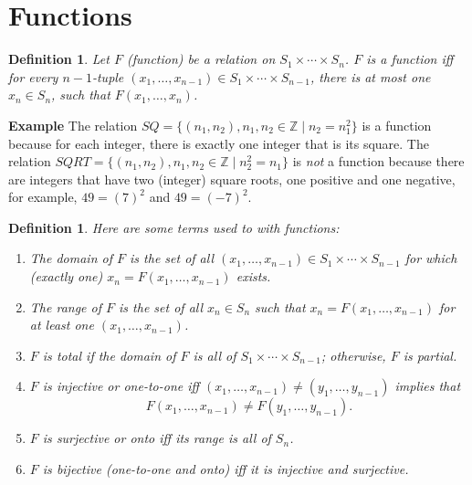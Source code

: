 \documentclass[12pt,a4paper]{article}
\newtheorem{definition}[theorem]{Definition}
\newenvironment{example}{\textbf{Example}}{}
\begin{document}
\section{Functions}

\begin{definition}\label{def.relfunc}
Let $F$ (function) be a relation on
$S_{1}\times \cdots \times S_{n}$. $F$ is a \emph{function}
iff for every $n\!\!-\!\!1$-tuple $(x_{1},\ldots,x_{n-1})\in S_{1}\times
\cdots \times S_{n-1}$, there is at most one $x_{n}\in S_{n}$, such that
$F(x_{1},\ldots,x_{n})$.
\end{definition}

\smallskip

\begin{example}
The relation $SQ = \{(n_1,n_2),n_1,n_2\in \mathbb{Z}\mid  n_2=n_1^2\}$ is a function because for each integer, there is exactly one integer that is its square. The relation $SQRT = \{(n_1,n_2),n_1,n_2\in \mathbb{Z}\mid n_2^2=n_1\}$ is \emph{not} a function because there are integers that have two (integer) square roots, one positive and one negative, for example, $49=(7)^2$ and $49=(-7)^2$.
\end{example}

\begin{definition}
Here are some terms used to with functions:
\begin{enumerate}
\item The \emph{domain} of $F$ is the
set of all $(x_{1},\ldots,x_{n-1})\in S_{1}\times \cdots \times
S_{n-1}$ for which (exactly one)
\(x_{n}=F(x_{1},\ldots,x_{n-1})\) exists.
\item The \emph{range} of $F$ is the set
of all $x_{n}\in S_{n}$ such that
\(x_{n}=F(x_{1},\ldots,x_{n-1})\) for at least one
$(x_{1},\ldots,x_{n-1})$.
\item $F$ is \emph{total} if the domain of $F$ is
all of $S_{1}\times \cdots \times S_{n-1}$; otherwise, $F$
is \emph{partial}.
\item $F$ is \emph{injective} or \emph{one-to-one} iff
$(x_{1},\ldots,x_{n-1}) \neq (y_{1},\ldots,y_{n-1})$ implies that
\[F(x_{1},\ldots,x_{n-1}) \neq
F(y_{1},\ldots,y_{n-1}).\]
\item $F$ is \emph{surjective} or \emph{onto} iff its range is
all of $S_{n}$.
\item $F$ is \emph{bijective} (\emph{one-to-one and onto}) iff it
is injective and surjective.
\end{enumerate}
\end{definition}
\end{document}
